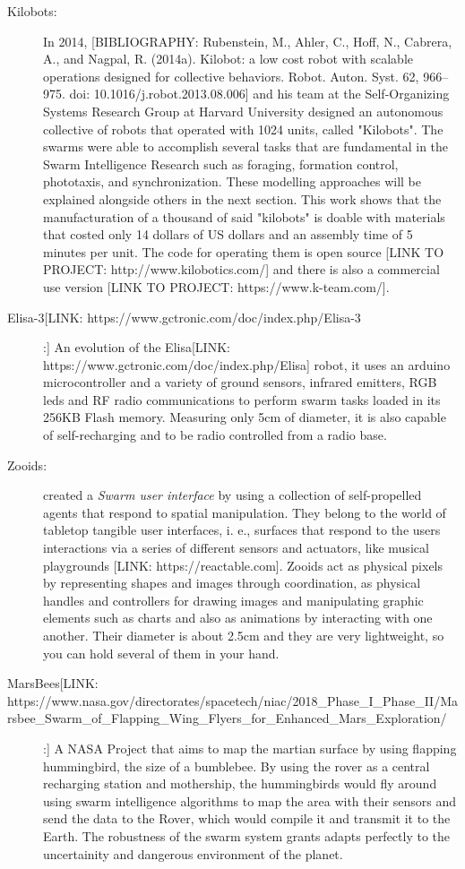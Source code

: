 \begin{description}
\item[Kilobots:] In 2014, [BIBLIOGRAPHY: Rubenstein, M., Ahler, C., Hoff, N., Cabrera, A., and Nagpal, R. (2014a). Kilobot: a low cost robot with scalable operations designed for collective behaviors. Robot. Auton. Syst. 62, 966–975. doi: 10.1016/j.robot.2013.08.006] and his team at the Self-Organizing Systems Research Group at Harvard University designed an autonomous collective of robots that operated with 1024 units, called "Kilobots". The swarms were able to accomplish several tasks that are fundamental in the Swarm Intelligence Research such as foraging, formation control, phototaxis, and synchronization. These modelling approaches will be explained alongside others in the next section. This work shows that the manufacturation of a thousand of said "kilobots" is doable with materials that costed only 14 dollars of US dollars and an assembly time of 5 minutes per unit. The code for operating them is open source [LINK TO PROJECT: http://www.kilobotics.com/] and there is also a commercial use version [LINK TO PROJECT: https://www.k-team.com/].

\item[Elisa-3[LINK: https://www.gctronic.com/doc/index.php/Elisa-3]:] An evolution of the Elisa[LINK: https://www.gctronic.com/doc/index.php/Elisa] robot, it uses an arduino microcontroller and a variety of ground sensors, infrared emitters, RGB leds and RF radio communications to perform swarm tasks loaded in its 256KB Flash memory. Measuring only 5cm of diameter, it is also capable of self-recharging and to be radio controlled from a radio base.

\item[Zooids:] \citep{E_Zooids} created a \emph{Swarm user interface} by using a collection of self-propelled agents that respond to spatial manipulation. They belong to the world of tabletop tangible user interfaces, i. e., surfaces that respond to the users interactions via a series of different sensors and actuators, like musical playgrounds [LINK: https://reactable.com]. Zooids act as physical pixels by representing shapes and images through coordination, as physical handles and controllers for drawing images and manipulating graphic elements such as charts and also as animations by interacting with one another. Their diameter is about 2.5cm and they are very lightweight, so you can hold several of them in your hand. 

\item[MarsBees[LINK: https://www.nasa.gov/directorates/spacetech/niac/2018_Phase_I_Phase_II/Marsbee_Swarm_of_Flapping_Wing_Flyers_for_Enhanced_Mars_Exploration/]:] A NASA Project that aims to map the martian surface by using flapping hummingbird, the size of a  bumblebee. By using the rover as a central recharging station and mothership, the hummingbirds would fly around using swarm intelligence algorithms to map the area with their sensors and send the data to the Rover, which would compile it and transmit it to the Earth. The robustness of the swarm system grants adapts perfectly to the uncertainity and dangerous environment of the planet. 


\end{description}
